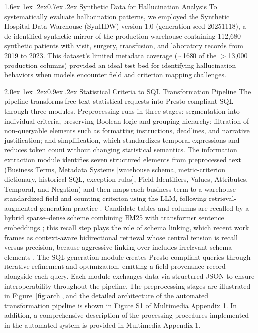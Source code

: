 \documentclass[10pt,twocolumn]{article}
\makeatletter
\renewcommand\subsection{\@startsection{subsection}{2}{\z@}%
  {2.0ex \@plus 1ex \@minus .2ex}{0.9ex \@plus .2ex}%
  {\normalfont\normalsize\bfseries}}
\renewcommand\subsubsection{\@startsection{subsubsection}{3}{\z@}%
  {1.6ex \@plus 1ex \@minus .2ex}{0.7ex \@plus .2ex}%
  {\normalfont\normalsize\itshape}}
\makeatother
\begin{document}
\subsubsection{Synthetic Data for Hallucination Analysis}
To systematically evaluate hallucination patterns, we employed the Synthetic Hospital Data Warehouse (SynHDW) version 1.0 (generation seed 20251118), a de-identified synthetic mirror of the production warehouse containing 112,680
synthetic patients with visit, surgery, transfusion, and laboratory records from
2019 to 2023. This dataset's limited metadata coverage ($\sim$1680 of the
$>$13,000 production columns) provided an ideal test bed for identifying
hallucination behaviors when models encounter field and criterion mapping
challenges.

\subsection{Statistical Criteria to SQL Transformation Pipeline}
The pipeline transforms free-text statistical requests into Presto-compliant SQL through three modules. Preprocessing runs in three stages: segmentation into individual criteria, preserving Boolean logic and grouping hierarchy; filtration of non-queryable elements such as formatting instructions, deadlines, and narrative justification; and simplification, which standardizes temporal expressions and reduces token count without changing statistical semantics. The information
extraction module identifies seven structured elements from preprocessed text
(Business Terms, Metadata Systems [warehouse schema, metric-criterion
dictionary, historical SQL, exception rules], Field Identifiers, Values,
Attributes, Temporal, and Negation) and then maps each business term to a
warehouse-standardized field and counting criterion using the LLM, following
retrieval-augmented generation practice \cite{lewis2020,finardi2024}. Candidate
tables and columns are recalled by a hybrid sparse--dense scheme combining BM25
\cite{bm252009} with transformer sentence embeddings
\cite{sbert2019,bert2019}; this recall step plays the
role of schema linking, which recent work frames as context-aware bidirectional
retrieval whose central tension is recall versus precision, because aggressive
linking over-includes irrelevant schema elements
\cite{schemalink2025,rslsql2024}. The SQL
generation module creates Presto-compliant queries through iterative refinement
and optimization, emitting a field-provenance record alongside each query. Each
module exchanges data via structured JSON to ensure interoperability throughout
the pipeline. The preprocessing stages are illustrated in Figure~\ref{fig:arch},
and the detailed architecture of the automated transformation pipeline is shown
in Figure S1 of Multimedia Appendix 1. In addition, a comprehensive description
of the processing procedures implemented in the automated system is provided in
Multimedia Appendix 1.
\end{document}
